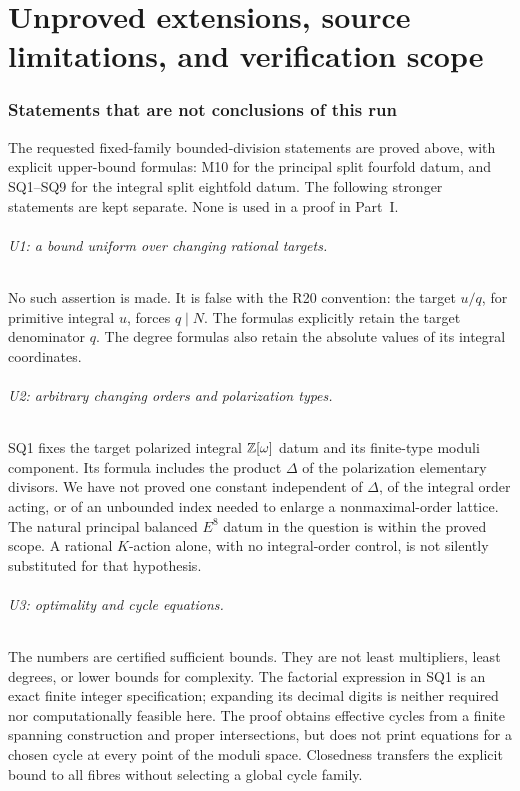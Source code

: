 \documentclass[11pt,a4paper]{article}
\theoremstyle{definition}\newtheorem{definition}[theorem]{Definition}
\theoremstyle{remark}\newtheorem{remark}[theorem]{Remark}
\begin{document}


\newpage
\part{Unproved extensions, source limitations, and verification scope}\label{part:open}
\section{Statements that are not conclusions of this run}
The requested fixed-family bounded-division statements are proved above, with explicit upper-bound formulas: M10 for the principal split fourfold datum, and SQ1--SQ9 for the integral split eightfold datum. The following stronger statements are kept separate. None is used in a proof in Part~I.

\paragraph{U1: a bound uniform over changing rational targets.}
No such assertion is made. It is false with the R20 convention: the target $u/q$, for primitive integral $u$, forces $q\mid N$. The formulas explicitly retain the target denominator $q$. The degree formulas also retain the absolute values of its integral coordinates.

\paragraph{U2: arbitrary changing orders and polarization types.}
SQ1 fixes the target polarized integral $\mathbb Z[\omega]$ datum and its finite-type moduli component. Its formula includes the product $\Delta$ of the polarization elementary divisors. We have not proved one constant independent of $\Delta$, of the integral order acting, or of an unbounded index needed to enlarge a nonmaximal-order lattice. The natural principal balanced $E^8$ datum in the question is within the proved scope. A rational $K$-action alone, with no integral-order control, is not silently substituted for that hypothesis.

\paragraph{U3: optimality and cycle equations.}
The numbers are certified sufficient bounds. They are not least multipliers, least degrees, or lower bounds for complexity. The factorial expression in SQ1 is an exact finite integer specification; expanding its decimal digits is neither required nor computationally feasible here. The proof obtains effective cycles from a finite spanning construction and proper intersections, but does not print equations for a chosen cycle at every point of the moduli space. Closedness transfers the explicit bound to all fibres without selecting a global cycle family.
\end{document}
